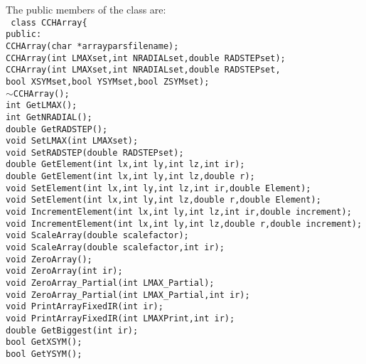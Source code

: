 \documentclass[10pt]{article}
\def\tab{\hspace*{9pt}}
\begin{document}
The public members of the class are:\\
{\tt
class CCHArray\{\\
\tab public:\\
\tab \tab CCHArray(char *arrayparsfilename);\\
\tab \tab CCHArray(int LMAXset,int NRADIALset,double RADSTEPset);\\
\tab \tab CCHArray(int LMAXset,int NRADIALset,double RADSTEPset,\\
\tab \tab bool XSYMset,bool YSYMset,bool ZSYMset);\\
\tab \tab $\sim$CCHArray();\\
\tab \tab int GetLMAX();\\
\tab \tab int GetNRADIAL();\\
\tab \tab double GetRADSTEP();\\
\tab \tab void SetLMAX(int LMAXset);\\
\tab \tab void SetRADSTEP(double RADSTEPset);\\
\tab \tab double GetElement(int lx,int ly,int lz,int ir);\\
\tab \tab double GetElement(int lx,int ly,int lz,double r);\\
\tab \tab void SetElement(int lx,int ly,int lz,int ir,double Element);\\
\tab \tab void SetElement(int lx,int ly,int lz,double r,double Element);\\
\tab \tab void IncrementElement(int lx,int ly,int lz,int ir,double increment);\\
\tab \tab void IncrementElement(int lx,int ly,int lz,double r,double increment);\\
\tab \tab void ScaleArray(double scalefactor);\\
\tab \tab void ScaleArray(double scalefactor,int ir);\\
\tab \tab void ZeroArray();\\
\tab \tab void ZeroArray(int ir);\\
\tab \tab void ZeroArray\_Partial(int LMAX\_Partial);\\
\tab \tab void ZeroArray\_Partial(int LMAX\_Partial,int ir);\\
\tab \tab void PrintArrayFixedIR(int ir);\\
\tab \tab void PrintArrayFixedIR(int LMAXPrint,int ir);\\
\tab \tab double GetBiggest(int ir);\\
\tab \tab bool GetXSYM();\\
\tab \tab bool GetYSYM();\\
}
\end{document}
